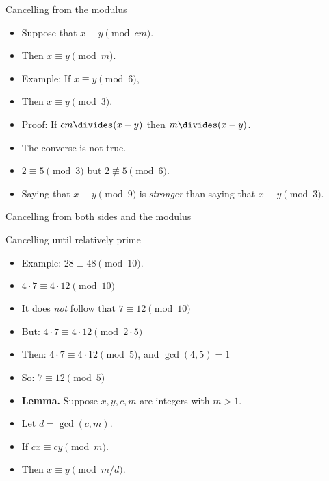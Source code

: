 \documentclass{beamer}
\begin{document}
\begin{frame}{Cancelling from the modulus}
\begin{itemize}
  \item Suppose that $x\equiv y \pmod {cm}$.
  \item Then $x\equiv y \pmod m$.
  \item Example: If $x\equiv y \pmod 6$,
  \item Then $x\equiv y \pmod 3$.
  \item Proof: If $cm \divides (x-y)$ then $m\divides (x-y)$.
  \item The converse is not true.
  \item $2\equiv 5 \pmod 3$ but $2\not\equiv 5 \pmod 6$.
  \item Saying that $x\equiv y \pmod 9$ is \emph{stronger} than saying that $x\equiv y \pmod 3$.
\end{itemize}
\end{frame}

\begin{frame}{Cancelling from both sides and the modulus}
\end{frame}

\begin{frame}{Cancelling until relatively prime}
\begin{itemize}
  \item Example: $28  $.
  \item $4   $
  \item It does \emph{not} follow that $7  $
  \item But:  $4   $
  \item Then:  $4   $, and $\gcd(4,5) = 1$
  \item So:  $7  $
  \item \textbf{Lemma.} Suppose $x,y,c,m$ are integers with $m>1$.
  \item Let $d=\gcd(c,m)$.
  \item If $cx\equiv cy \pmod m$.
  \item Then $x\equiv y $.
\end{itemize}
\end{frame}
\end{document}
